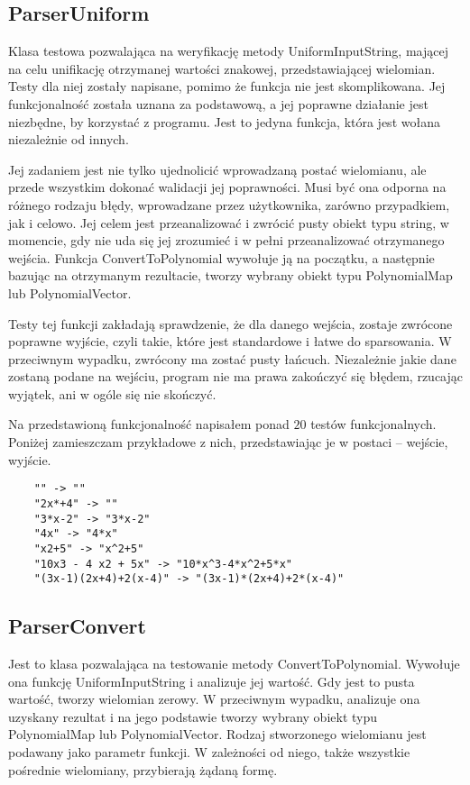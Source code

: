 \documentclass[oneside,a4paper]{book}
\begin{document}
	\subsection{ParserUniform}
	
	Klasa testowa pozwalająca na weryfikację metody UniformInputString, mającej na celu unifikację otrzymanej wartości znakowej, przedstawiającej wielomian. Testy dla niej zostały napisane, pomimo że funkcja nie jest skomplikowana. Jej funkcjonalność została uznana za podstawową, a jej poprawne działanie jest niezbędne, by korzystać z programu. Jest to jedyna funkcja, która jest wołana niezależnie od innych.
	
	Jej zadaniem jest nie tylko ujednolicić wprowadzaną postać wielomianu, ale przede wszystkim dokonać walidacji jej poprawności. Musi być ona odporna na różnego rodzaju błędy, wprowadzane przez użytkownika, zarówno przypadkiem, jak i celowo. Jej celem jest przeanalizować i zwrócić pusty obiekt typu string, w momencie, gdy nie uda się jej zrozumieć i w pełni przeanalizować otrzymanego wejścia. Funkcja ConvertToPolynomial wywołuje ją na początku, a następnie bazując na otrzymanym rezultacie, tworzy wybrany obiekt typu PolynomialMap lub PolynomialVector.
	
	Testy tej funkcji zakładają sprawdzenie, że dla danego wejścia, zostaje zwrócone poprawne wyjście, czyli takie, które jest standardowe i łatwe do sparsowania. W przeciwnym wypadku, zwrócony ma zostać pusty łańcuch. Niezależnie jakie dane zostaną podane na wejściu, program nie ma prawa zakończyć się błędem, rzucając wyjątek, ani w ogóle się nie skończyć.
	
	Na przedstawioną funkcjonalność napisałem ponad $20$ testów funkcjonalnych. Poniżej zamieszczam przykładowe z nich, przedstawiając je w postaci -- wejście, wyjście. 
	
	\begin{lstlisting}
	"" -> ""
	"2x*+4" -> ""
	"3*x-2" -> "3*x-2"
	"4x" -> "4*x"
	"x2+5" -> "x^2+5"
	"10x3 - 4 x2 + 5x" -> "10*x^3-4*x^2+5*x"
	"(3x-1)(2x+4)+2(x-4)" -> "(3x-1)*(2x+4)+2*(x-4)"
	\end{lstlisting}
	
	\subsection{ParserConvert}
	
	Jest to klasa pozwalająca na testowanie metody ConvertToPolynomial. Wywołuje ona funkcję UniformInputString i analizuje jej wartość. Gdy jest to pusta wartość, tworzy wielomian zerowy. W przeciwnym wypadku, analizuje ona uzyskany rezultat i na jego podstawie tworzy wybrany obiekt typu PolynomialMap lub PolynomialVector. Rodzaj stworzonego wielomianu jest podawany jako parametr funkcji. W zależności od niego, także wszystkie pośrednie wielomiany, przybierają żądaną formę.
	
\end{document}
